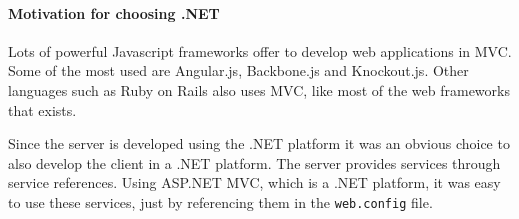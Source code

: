 \documentclass[../report.tex]{subfiles}
\begin{document}
\paragraph{Motivation for choosing .NET}
Lots of powerful Javascript frameworks offer to develop web applications in MVC. Some of the most used are Angular.js, Backbone.js and Knockout.js. Other languages such as Ruby on Rails also uses MVC, like most of the web frameworks that exists.

Since the server is developed using the .NET platform it was an obvious choice to also develop the client in a .NET platform. The server provides services through service references. Using ASP.NET MVC, which is a .NET platform, it was easy to use these services, just by referencing them in the \texttt{web.config} file. 
\end{document}
